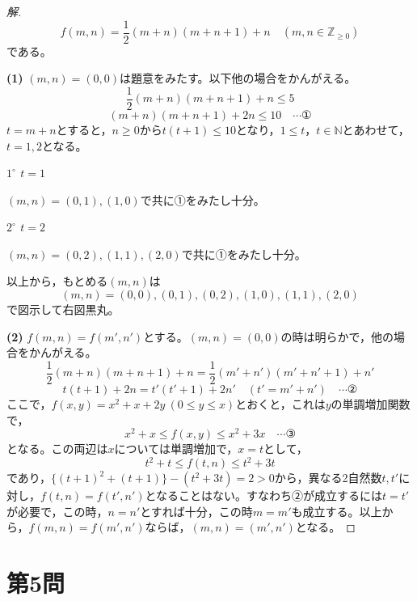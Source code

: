 \documentclass[../main.tex]{subfiles}
\begin{document}
\begin{proof}[解]
  \[
    f(m,n)=\frac12(m+n)(m+n+1)+n \quad(m,n\in\mathbb{Z}_{\ge0})
  \]
  である。

  \textbf{(1)} $(m,n)=(0,0)$は題意をみたす。以下他の場合をかんがえる。
  \[
    \frac12(m+n)(m+n+1)+n\le5
  \]
  \[
    (m+n)(m+n+1)+2n\le10 \quad\cdots\text{①}
  \]
  $t=m+n$とすると，$n\ge0$から$t(t+1)\le10$となり，$1\le t$，$t\in\mathbb{N}$とあわせて，$t=1,2$となる。

  \textbf{$1^\circ$ $t=1$}

  $(m,n)=(0,1),(1,0)$で共に①をみたし十分。

  \textbf{$2^\circ$ $t=2$}

  $(m,n)=(0,2),(1,1),(2,0)$で共に①をみたし十分。

  以上から，もとめる$(m,n)$は
  \[
    (m,n)=(0,0),(0,1),(0,2),(1,0),(1,1),(2,0)
  \]
  で図示して右図黒丸。

  \begin{center}
  \end{center}

  \textbf{(2)} $f(m,n)=f(m',n')$とする。$(m,n)=(0,0)$の時は明らかで，他の場合をかんがえる。
  \[
    \frac12(m+n)(m+n+1)+n=\frac12(m'+n')(m'+n'+1)+n'
  \]
  \[
    t(t+1)+2n=t'(t'+1)+2n' \quad(t'=m'+n') \quad\cdots\text{②}
  \]
  ここで，$f(x,y)=x^2+x+2y\ (0\le y\le x)$とおくと，これは$y$の単調増加関数で，
  \[
    x^2+x\le f(x,y)\le x^2+3x \quad\cdots\text{③}
  \]
  となる。この両辺は$x$については単調増加で，$x=t$として，
  \[
    t^2+t\le f(t,n)\le t^2+3t
  \]
  であり，$\{(t+1)^2+(t+1)\}-(t^2+3t)=2>0$から，異なる2自然数$t,t'$に対し，$f(t,n)=f(t',n')$となることはない。すなわち②が成立するには$t=t'$が必要で，この時，$n=n'$とすれば十分，この時$m=m'$も成立する。以上から，$f(m,n)=f(m',n')$ならば，$(m,n)=(m',n')$となる。
\end{proof}

\newpage

\section*{第5問}
\end{document}
